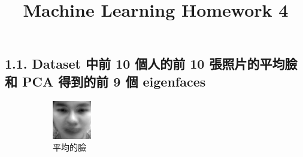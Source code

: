 \documentclass[fleqn,a4paper,12pt]{article}
\title{Machine Learning Homework 4}
\date{}
\begin{document}
\maketitle
\thispagestyle{fancy}

\subsection*{1.1. Dataset 中前 10 個人的前 10 張照片的平均臉和 PCA 得到的前 9 個 eigenfaces}

\begin{figure}[H]
\centering
\begin{subfigure}{.1\textwidth}
  \centering
  \includegraphics[width=\linewidth]{problem1/avg-face.png}
  \caption{平均的臉}
  \label{fig:sub1}
\end{subfigure}%
\begin{subfigure}{.3\textwidth}
  \centering

\end{subfigure}
\end{figure}
\end{document}
